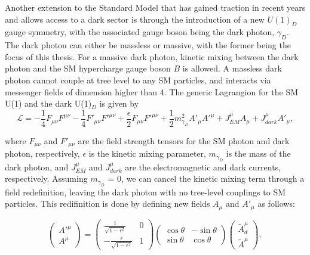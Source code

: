 Another extension to the Standard Model that has gained traction in recent years and allows access to a dark sector is through the introduction of a new $U(1)_D$ gauge symmetry, with the associated gauge boson being the dark photon, $\gamma_D$.
The dark photon can either be massless or massive, with the former being the focus of this thesis.
For a massive dark photon, kinetic mixing between the dark photon and the SM hypercharge gauge boson $B$ is allowed.
A massless dark photon cannot couple at tree level to any SM particles, and interacts via messenger fields of dimension higher than 4.
The generic Lagrangion for the SM U(1) and the dark U(1)$_D$ is given by
\begin{equation}
    \mathcal{L} = -\frac{1}{4} F_{\mu\nu} F^{\mu\nu} - \frac{1}{4} F'_{\mu\nu} F'^{\mu\nu} + \frac{\epsilon}{2} F_{\mu\nu} F'^{\mu\nu} + \frac{1}{2} m^2_{\gamma_D} A'_\mu A'^\mu + J^\mu_{EM} A_\mu + J^\mu_{dark} A'_\mu,
    \label{dark_photon_lagrangian}
\end{equation}

where $F_{\mu\nu}$ and $F'_{\mu\nu}$ are the field strength tensors for the SM photon and dark photon, respectively, $\epsilon$ is the kinetic mixing parameter, $m_{\gamma_D}$ is the mass of the dark photon, and $J^\mu_{EM}$ and $J^\mu_{dark}$ are the electromagnetic and dark currents, respectively.
Assuming $m_{\gamma_D}$ = 0, we can cancel the kinetic mixing term through a field redefinition, leaving the dark photon with no tree-level couplings to SM particles.
This redifinition is done by defining new fields $A_\mu$ and $A'_\mu$ as follows:

\begin{equation}
    \begin{pmatrix} A'^\mu \\ A^\mu \end{pmatrix} = \begin{pmatrix} \frac{1}{\sqrt{1-\epsilon^2}} & 0 \\ -\frac{\epsilon}{\sqrt{1-\epsilon^2}} & 1 \end{pmatrix} \begin{pmatrix} \cos\theta & -\sin\theta \\ \sin\theta & \cos\theta \end{pmatrix} \begin{pmatrix} \tilde{A}^\mu_d \\ \tilde{A}^\mu \end{pmatrix},
    \label{field_redefinition}
\end{equation}


